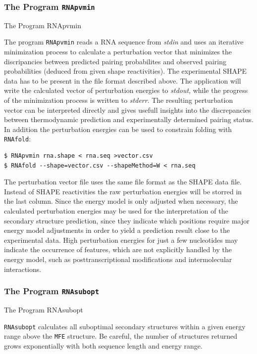 \documentclass[]{article}
\begin{document}
\subsubsection{The Program \texttt{RNApvmin}}{The Program RNApvmin}\label{the-program-rnapvmin}

The program \texttt{RNApvmin} reads a RNA sequence from \emph{stdin} and
uses an iterative minimization process to calculate a perturbation
vector that minimizes the discripancies between predicted pairing
probabilites and observed pairing probabilities (deduced from given
shape reactivities). The experimental SHAPE data has to be present in
the file format described above. The application will write the
calculated vector of perturbation energies to \emph{stdout}, while the
progress of the minimization process is written to \emph{stderr}. The
resulting perturbation vector can be interpreted directly and gives
usefull insights into the discrepancies between thermodynamic prediction
and experimentally determined pairing status. In addition the
perturbation energies can be used to constrain folding with
\texttt{RNAfold}:

\begin{verbatim}
$ RNApvmin rna.shape < rna.seq >vector.csv
$ RNAfold --shape=vector.csv --shapeMethod=W < rna.seq
\end{verbatim}

The perturbation vector file uses the same file format as the SHAPE data
file. Instead of SHAPE reactivities the raw perturbation energies will be
storred in the last column. Since the energy model is only adjusted when
necessary, the calculated perturbation energies may be used for the
interpretation of the secondary structure prediction, since they
indicate which positions require major energy model adjustments in order
to yield a prediction result close to the experimental data. High
perturbation energies for just a few nucleotides may indicate the
occurrence of features, which are not explicitly handled by the energy
model, such as posttranscriptional modifications and intermolecular
interactions.

\subsubsection{The Program \texttt{RNAsubopt}}{The Program RNAsubopt}\label{the-program-rnasubopt}

\texttt{RNAsubopt} calculates all suboptimal secondary structures within
a given energy range above the \texttt{MFE} structure. Be careful, the
number of structures returned grows exponentially with both sequence
length and energy range.
\end{document}
